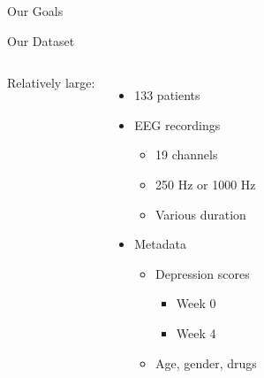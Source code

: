 \documentclass{beamer}
\begin{document}

\begin{frame}{Our Goals}
  
\end{frame}


\begin{frame}{Our Dataset}
	\begin{columns}
        Relatively large:
        \begin{itemize}
            \item 133 patients
            \item EEG recordings
              \begin{itemize}
                \item 19 channels
                \item 250 Hz or 1000 Hz
                \item Various duration
              \end{itemize}
              \item Metadata
                  \begin{itemize}
                      \item Depression scores
                          \begin{itemize}
                              \item Week 0
                              \item Week 4
                          \end{itemize}
                       \item Age, gender, drugs
                  \end{itemize}
        \end{itemize}
					

\end{columns}
\end{frame}
\end{document}

